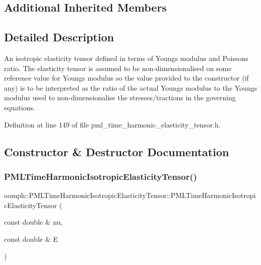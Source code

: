 \subsection*{Additional Inherited Members}


\subsection{Detailed Description}
An isotropic elasticity tensor defined in terms of Young\textquotesingle{}s modulus and Poisson\textquotesingle{}s ratio. The elasticity tensor is assumed to be non-\/dimensionalised on some reference value for Young\textquotesingle{}s modulus so the value provided to the constructor (if any) is to be interpreted as the ratio of the actual Young\textquotesingle{}s modulus to the Young\textquotesingle{}s modulus used to non-\/dimensionalise the stresses/tractions in the governing equations. 

Definition at line 149 of file pml\+\_\+time\+\_\+harmonic\+\_\+elasticity\+\_\+tensor.\+h.



\subsection{Constructor \& Destructor Documentation}
\mbox{\label{classoomph_1_1PMLTimeHarmonicIsotropicElasticityTensor_a31b82a650e6e7f7485d0bf94eac00883}} 
\subsubsection{\texorpdfstring{P\+M\+L\+Time\+Harmonic\+Isotropic\+Elasticity\+Tensor()}{PMLTimeHarmonicIsotropicElasticityTensor()}\hspace{0.1cm}{\footnotesize\ttfamily [1/2]}}
{\footnotesize\ttfamily oomph\+::\+P\+M\+L\+Time\+Harmonic\+Isotropic\+Elasticity\+Tensor\+::\+P\+M\+L\+Time\+Harmonic\+Isotropic\+Elasticity\+Tensor (\begin{DoxyParamCaption}\item[{const double \&}]{nu,  }\item[{const double \&}]{E }\end{DoxyParamCaption})\hspace{0.3cm}{\ttfamily [inline]}}



